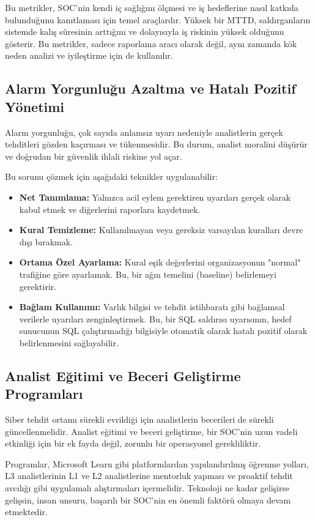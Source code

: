 Bu metrikler, SOC'nin kendi iç sağlığını ölçmesi ve iş hedeflerine nasıl katkıda bulunduğunu kanıtlaması için temel araçlardır. Yüksek bir MTTD, saldırganların sistemde kalış süresinin arttığını ve dolayısıyla iş riskinin yüksek olduğunu gösterir. Bu metrikler, sadece raporlama aracı olarak değil, aynı zamanda kök neden analizi ve iyileştirme için de kullanılır.

\subsection{Alarm Yorgunluğu Azaltma ve Hatalı Pozitif Yönetimi}

Alarm yorgunluğu, çok sayıda anlamsız uyarı nedeniyle analistlerin gerçek tehditleri gözden kaçırması ve tükenmesidir. Bu durum, analist moralini düşürür ve doğrudan bir güvenlik ihlali riskine yol açar.

Bu sorunu çözmek için aşağıdaki teknikler uygulanabilir:
\begin{itemize}
    \item \textbf{Net Tanımlama:} Yalnızca acil eylem gerektiren uyarıları gerçek olarak kabul etmek ve diğerlerini raporlara kaydetmek.
    \item \textbf{Kural Temizleme:} Kullanılmayan veya gereksiz varsayılan kuralları devre dışı bırakmak.
    \item \textbf{Ortama Özel Ayarlama:} Kural eşik değerlerini organizasyonun "normal" trafiğine göre ayarlamak. Bu, bir ağın temelini (baseline) belirlemeyi gerektirir.
    \item \textbf{Bağlam Kullanımı:} Varlık bilgisi ve tehdit istihbaratı gibi bağlamsal verilerle uyarıları zenginleştirmek. Bu, bir SQL saldırısı uyarısının, hedef sunucunun SQL çalıştırmadığı bilgisiyle otomatik olarak hatalı pozitif olarak belirlenmesini sağlayabilir.
\end{itemize}

\subsection{Analist Eğitimi ve Beceri Geliştirme Programları}

Siber tehdit ortamı sürekli evrildiği için analistlerin becerileri de sürekli güncellenmelidir. Analist eğitimi ve beceri geliştirme, bir SOC'nin uzun vadeli etkinliği için bir ek fayda değil, zorunlu bir operasyonel gerekliliktir.

Programlar, Microsoft Learn gibi platformlardan yapılandırılmış öğrenme yolları, L3 analistlerinin L1 ve L2 analistlerine mentorluk yapması ve proaktif tehdit avcılığı gibi uygulamalı alıştırmaları içermelidir. Teknoloji ne kadar gelişirse gelişsin, insan unsuru, başarılı bir SOC'nin en önemli faktörü olmaya devam etmektedir.

